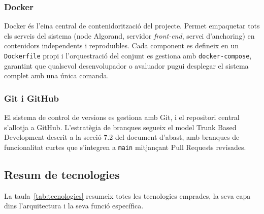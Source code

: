 \subsubsection{Docker}
 
Docker és l'eina central de contenidorització del projecte. Permet empaquetar tots els serveis del sistema (node Algorand, servidor \textit{front-end}, servei d'anchoring) en contenidors independents i reproduïbles. Cada component es defineix en un \texttt{Dockerfile} propi i l'orquestració del conjunt es gestiona amb \texttt{docker-compose}, garantint que qualsevol desenvolupador o avaluador pugui desplegar el sistema complet amb una única comanda.
 
\subsubsection{Git i GitHub}
 
El sistema de control de versions es gestiona amb Git, i el repositori central s'allotja a GitHub. L'estratègia de branques segueix el model Trunk Based Development descrit a la secció 7.2 del document d'abast, amb branques de funcionalitat curtes que s'integren a \texttt{main} mitjançant Pull Requests revisades.
 
\subsection{Resum de tecnologies}
 
La taula~\ref{tab:tecnologies} resumeix totes les tecnologies emprades, la seva capa dins l'arquitectura i la seva funció específica.
 
